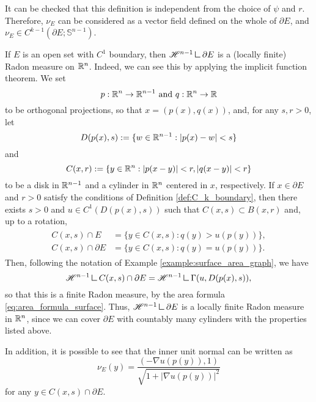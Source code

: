 It can be checked that this definition is independent from the choice of $\psi$ and $r$. Therefore, $\nu_{E}$ can be considered as a vector field defined on the whole of $\partial E$, and $\nu_{E} \in C^{k - 1}(\partial E; \mathbb{S}^{n - 1})$.

\begin{remark}\label{rem:local_param_C_1}
If $E$ is an open set with $C^{1}$ boundary, then $\Haus{n - 1} \res \partial E$ is a (locally finite) Radon measure on $\mathbb{R}^{n}$.
Indeed, we can see this by applying the implicit function theorem. We set 
\begin{equation*}
p: \mathbb{R}^{n} \to \mathbb{R}^{n - 1} \text{ and } q :\mathbb{R}^{n} \to \mathbb{R}
\end{equation*}
to be orthogonal projections, so that $x = (p(x), q(x))$, and, for any $s, r > 0$, let
\begin{equation*}
D(p(x), s) := \{ w \in \mathbb{R}^{n - 1} : |p(x) - w| < s \} 
\end{equation*}
and 
\begin{equation*}
C(x, r) := \{ y \in \mathbb{R}^{n} : |p(x - y)| < r, |q(x - y)| < r \}
\end{equation*}
to be a disk in $\mathbb{R}^{n - 1}$ and a cylinder in $\mathbb{R}^{n}$ centered in $x$, respectively. If $x \in \partial E$ and $r > 0$ satisfy the conditions of Definition \ref{def:C_k_boundary}, then there exists $s > 0$ and $u \in C^{1}(D(p(x), s))$ such that $C(x, s) \subset B(x, r)$ and, up to a rotation,
\begin{align} 
\begin{split} \label{eq:param_C_1}
C(x, s) \cap E & = \{ y \in C(x, s) : q(y) > u(p(y)) \}, \\
C(x, s) \cap \partial E & = \{ y \in C(x, s) : q(y) = u(p(y)) \}.
\end{split}
\end{align}
Then, following the notation of Example \ref{example:surface_area_graph}, we have
\begin{equation*}
\Haus{n - 1} \res C(x, s) \cap \partial E = \Haus{n - 1} \res \Gamma(u, D(p(x), s)),
\end{equation*}
so that this is a finite Radon measure, by the area formula \eqref{eq:area_formula_surface}. Thus, $\Haus{n - 1}\res \partial E$ is a locally finite Radon measure in $\mathbb{R}^{n}$, since we can cover $\partial E$ with countably many cylinders with the properties listed above.

In addition, it is possible to see that the inner unit normal can be written as
\begin{equation} \label{eq:inner_unit_param}
\nu_{E}(y)= \frac{(- \nabla u(p(y)), 1)}{\sqrt{1 + |\nabla u(p(y))|^2}}
\end{equation}
for any $y \in C(x, s) \cap \partial E$.
\end{remark}

